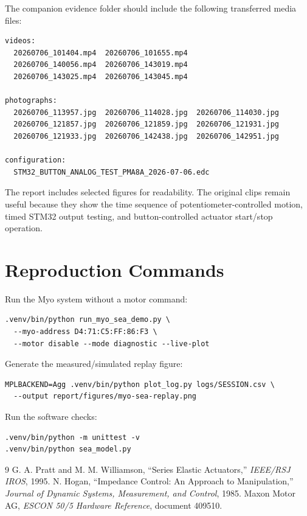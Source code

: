 \documentclass[11pt,a4paper]{report}
\begin{document}
The companion evidence folder should include the following transferred media files:
\begin{verbatim}
videos:
  20260706_101404.mp4  20260706_101655.mp4
  20260706_140056.mp4  20260706_143019.mp4
  20260706_143025.mp4  20260706_143045.mp4

photographs:
  20260706_113957.jpg  20260706_114028.jpg  20260706_114030.jpg
  20260706_121857.jpg  20260706_121859.jpg  20260706_121931.jpg
  20260706_121933.jpg  20260706_142438.jpg  20260706_142951.jpg

configuration:
  STM32_BUTTON_ANALOG_TEST_PMA8A_2026-07-06.edc
\end{verbatim}

The report includes selected figures for readability. The original clips remain useful because they show the time sequence of potentiometer-controlled motion, timed STM32 output testing, and button-controlled actuator start/stop operation.

\chapter{Reproduction Commands}

Run the Myo system without a motor command:
\begin{verbatim}
.venv/bin/python run_myo_sea_demo.py \
  --myo-address D4:71:C5:FF:86:F3 \
  --motor disable --mode diagnostic --live-plot
\end{verbatim}

Generate the measured/simulated replay figure:
\begin{verbatim}
MPLBACKEND=Agg .venv/bin/python plot_log.py logs/SESSION.csv \
  --output report/figures/myo-sea-replay.png
\end{verbatim}

Run the software checks:
\begin{verbatim}
.venv/bin/python -m unittest -v
.venv/bin/python sea_model.py
\end{verbatim}

\begin{thebibliography}{9}
 G. A. Pratt and M. M. Williamson, ``Series Elastic Actuators,'' \emph{IEEE/RSJ IROS}, 1995.
 N. Hogan, ``Impedance Control: An Approach to Manipulation,'' \emph{Journal of Dynamic Systems, Measurement, and Control}, 1985.
\bibitem{escon} Maxon Motor AG, \emph{ESCON 50/5 Hardware Reference}, document 409510.
\end{thebibliography}
\end{document}
